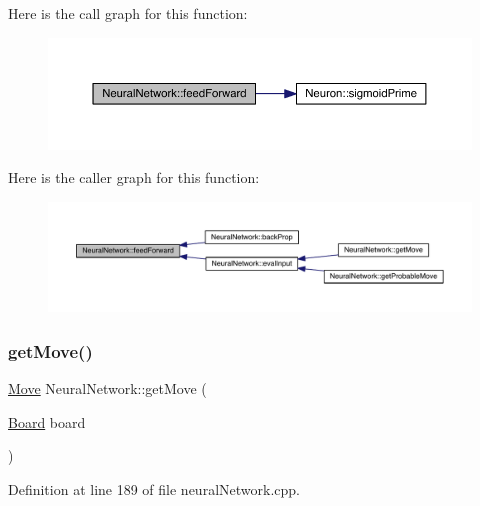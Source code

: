 Here is the call graph for this function\+:\nopagebreak
\begin{figure}[H]
\begin{center}
\leavevmode
\includegraphics[width=350pt]{class_neural_network_a7ebe119117046615958557e820b90c67_cgraph}
\end{center}
\end{figure}
Here is the caller graph for this function\+:\nopagebreak
\begin{figure}[H]
\begin{center}
\leavevmode
\includegraphics[width=350pt]{class_neural_network_a7ebe119117046615958557e820b90c67_icgraph}
\end{center}
\end{figure}
\mbox{\label{class_neural_network_af773d118844a6dc42c8a4edc05652893}} 
\subsubsection{\texorpdfstring{get\+Move()}{getMove()}}
{\footnotesize\ttfamily \hyperlink{struct_move}{Move} Neural\+Network\+::get\+Move (\begin{DoxyParamCaption}\item[{\hyperlink{constants_8h_af901d0acc1572fb0c779f84ddd2c6ce8}{Board}}]{board }\end{DoxyParamCaption})}



Definition at line 189 of file neural\+Network.\+cpp.

